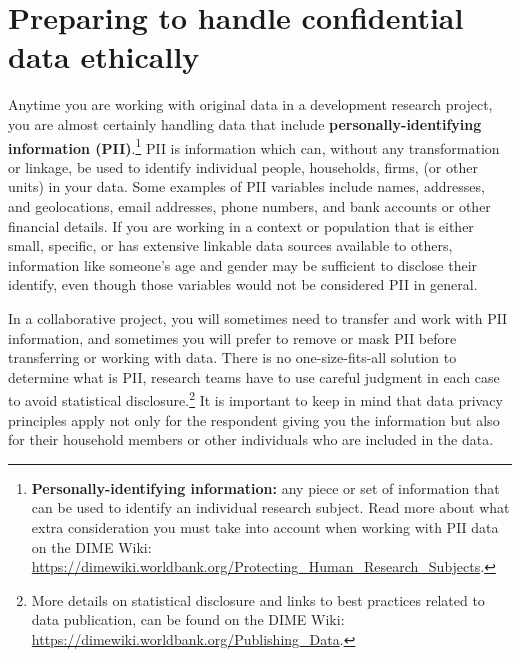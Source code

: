 \documentclass[
]{book}
\begin{document}
\hypertarget{preparing-to-handle-confidential-data-ethically}{%
\section*{Preparing to handle confidential data ethically}\label{preparing-to-handle-confidential-data-ethically}}

Anytime you are working with original data in a development research project,
you are almost certainly handling data that include
\textbf{personally-identifying information (PII)}.\footnote{\textbf{Personally-identifying information:} any piece or set of information
  that can be used to identify an individual research subject.
  Read more about what extra consideration
  you must take into account when
  working with PII data on the DIME Wiki:
  \url{https://dimewiki.worldbank.org/Protecting_Human_Research_Subjects}.}
PII is information which can, without any transformation or linkage,
be used to identify individual people, households, firms,
(or other units) in your data.
Some examples of PII variables include names, addresses, and geolocations,
email addresses, phone numbers,
and bank accounts or other financial details.
If you are working in a context or population that is either small, specific,
or has extensive linkable data sources available to others,
information like someone's age and gender may be sufficient to
disclose their identify, even though those variables would not be considered PII in general.

In a collaborative project,
you will sometimes need to transfer and work with PII information,
and sometimes you will prefer to remove or mask PII
before transferring or working with data.
There is no one-size-fits-all solution to determine what is PII,
research teams have to use careful judgment in each case to avoid statistical disclosure.\footnote{More details on statistical disclosure and
  links to best practices related to data publication,
  can be found on the DIME Wiki:
  \url{https://dimewiki.worldbank.org/Publishing_Data}.}
It is important to keep in mind that data privacy principles apply
not only for the respondent giving you the information
but also for their household members or other individuals who are included in the data.
\end{document}
